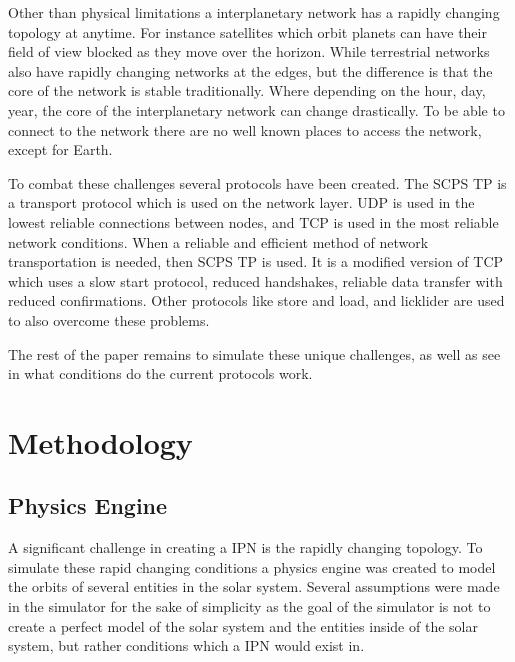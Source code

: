 \documentclass[a4paper,12pt]{article}
\begin{document}
Other than physical limitations a interplanetary network has a rapidly changing topology at anytime. For instance satellites 
which orbit planets can have their field of view blocked as they move over the horizon. While terrestrial networks also have 
rapidly changing networks at the edges, but the difference is that the core of the network is stable traditionally. Where 
depending on the hour, day, year, the core of the interplanetary network can change drastically. To be able to connect to the 
network there are no well known places to access the network, except for Earth. 

To combat these challenges several protocols have been created. The SCPS TP is a transport protocol which is used on the network 
layer. UDP is used in the lowest reliable connections between nodes, and TCP is used in the most reliable network 
conditions. When a reliable and efficient method of network transportation is needed, then SCPS TP is used. It is a modified 
version of TCP which uses a slow start protocol, reduced handshakes, reliable data transfer with reduced confirmations. Other 
protocols like store and load, and licklider are used to also overcome these problems.

The rest of the paper remains to simulate these unique challenges, as well as see in what conditions do the current protocols 
work.

\section{Methodology}

\subsection{Physics Engine}

A significant challenge in creating a IPN is the rapidly changing topology. To simulate 
these rapid changing conditions a physics engine was created to model the orbits of several 
entities in the solar system. Several assumptions were made in the simulator for the sake of 
simplicity as the goal of the simulator is not to create a perfect model of the solar system 
and the entities inside of the solar system, but rather conditions which a IPN would exist in. 
\end{document}
